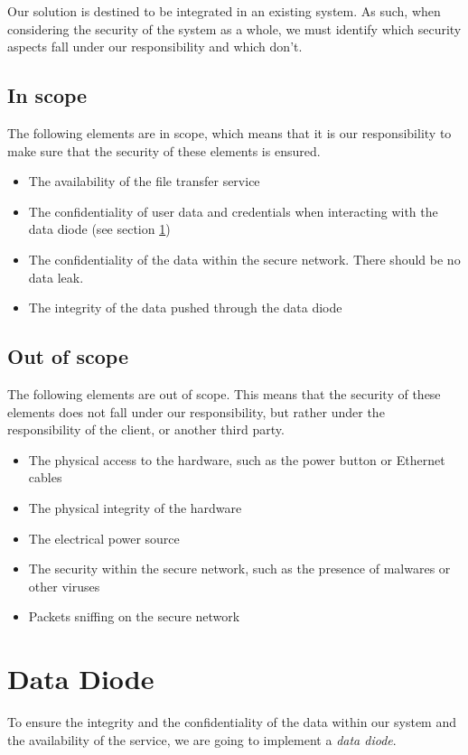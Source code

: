 \documentclass[a4paper,11pt]{article}
\begin{document}
Our solution is destined to be integrated in an existing system. As such, when considering the security of the system as a whole, we must identify which security aspects fall under our responsibility and which don't. 

\subsection{In scope}
The following elements are in scope, which means that it is our responsibility to make sure that the security of these elements is ensured.

\begin{itemize}
\item{The availability of the file transfer service}
\item{The confidentiality of user data and credentials when interacting with the data diode (see section \ref{sec:data-diode})}
\item{The confidentiality of the data within the secure network. There should be no data leak.}
\item{The integrity of the data pushed through the data diode}
\end{itemize}

\subsection{Out of scope}
\label{sec:outscope}
The following elements are out of scope. This means that the security of these elements does not fall under our responsibility, but rather under the responsibility of the client, or another third party.

\begin{itemize}
\item{The physical access to the hardware, such as the power button or Ethernet cables}
\item{The physical integrity of the hardware}
\item{The electrical power source}
\item{The security within the secure network, such as the presence of malwares or other viruses}
\item{Packets sniffing on the secure network}
\end{itemize}


\section{Data Diode}
\label{sec:data-diode}
To ensure the integrity and the confidentiality of the data within our system and the availability of the service, we are going to implement a \textit{data diode}.\\
\end{document}
